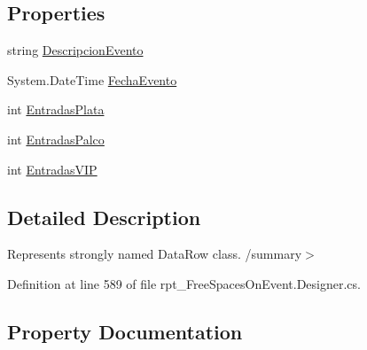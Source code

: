 \subsection*{Properties}
\begin{DoxyCompactItemize}
\item 
string \hyperlink{classprj_progra_i_i_i_1_1rpt___free_spaces_on_event_1_1rpt___free_spaces_on_event_row_adae359c1724b7c1cd3d846bb792facbe}{Descripcion\+Evento}
\item 
System.\+Date\+Time \hyperlink{classprj_progra_i_i_i_1_1rpt___free_spaces_on_event_1_1rpt___free_spaces_on_event_row_a8a27b907c3a665ac5b70cd85be34de9e}{Fecha\+Evento}
\item 
int \hyperlink{classprj_progra_i_i_i_1_1rpt___free_spaces_on_event_1_1rpt___free_spaces_on_event_row_ad7f744e3b4eccb8f48a887a9770a1bca}{Entradas\+Plata}
\item 
int \hyperlink{classprj_progra_i_i_i_1_1rpt___free_spaces_on_event_1_1rpt___free_spaces_on_event_row_a26e359c5feaa4c9a3632d3a34a5d020c}{Entradas\+Palco}
\item 
int \hyperlink{classprj_progra_i_i_i_1_1rpt___free_spaces_on_event_1_1rpt___free_spaces_on_event_row_a41ce89876431462600b938a6a4e03190}{Entradas\+V\+IP}
\end{DoxyCompactItemize}


\subsection{Detailed Description}
Represents strongly named Data\+Row class. /summary$>$ 

Definition at line 589 of file rpt\+\_\+\+Free\+Spaces\+On\+Event.\+Designer.\+cs.



\subsection{Property Documentation}
\hypertarget{classprj_progra_i_i_i_1_1rpt___free_spaces_on_event_1_1rpt___free_spaces_on_event_row_adae359c1724b7c1cd3d846bb792facbe}{}\label{classprj_progra_i_i_i_1_1rpt___free_spaces_on_event_1_1rpt___free_spaces_on_event_row_adae359c1724b7c1cd3d846bb792facbe} 
